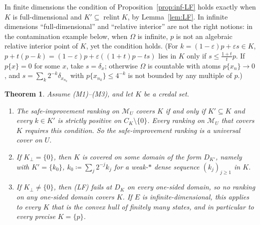 \documentclass[11pt]{article}
\newcommand{\M}{\mathcal{M}}
\DeclareMathOperator{\relint}{relint}
\theoremstyle{plain}
\newtheorem{theorem}{Theorem}[section]
\theoremstyle{definition}
\theoremstyle{remark}
\begin{document}
In finite dimensions the condition of Proposition~\ref{prop:inf-LF} holds exactly when $K$
is full-dimensional and $K'\subseteq\relint K$, by Lemma~\ref{lem:LF}. In infinite
dimensions ``full-dimensional'' and ``relative interior'' are not the right notions: in
the contamination example below, when $\Omega$ is infinite, $p$ is not an algebraic
relative interior point of $K$, yet the condition holds. (For $k=(1-\varepsilon)p+
\varepsilon s\in K$, $p+t(p-k)=(1-\varepsilon)p+\varepsilon((1+t)p-ts)$ lies in $K$ only if
$s\le\frac{1+t}tp$. If $p\{x\}=0$ for some $x$, take $s=\delta_x$; otherwise $\Omega$ is
countable with atoms $p\{x_n\}\to0$, and $s=\sum_k2^{-k}\delta_{x_{n_k}}$ with $p\{x_{n_k}\}
\le4^{-k}$ is not bounded by any multiple of $p$.)

\begin{theorem}\label{thm:inf-cover}
Assume (M1)--(M3), and let $K$ be a credal set.
\begin{enumerate}[label=(\alph*)]
  \item The safe-improvement ranking on $\M_U$ covers $K$ if and only if $K'\subseteq K$
  and every $k\in K'$ is strictly positive on $C_K\setminus\{0\}$. Every ranking on $\M_U$
  that covers $K$ requires this condition. So the safe-improvement ranking is a universal
  cover on $U$.
  \item If $K_\perp=\{0\}$, then $K$ is covered on some domain of the form $D_{K'}$, namely
  with $K'=\{k_0\}$, $k_0\coloneqq\sum_j2^{-j}k_j$ for a weak-$\ast$ dense sequence
  $(k_j)_{j\ge1}$ in $K$.
  \item If $K_\perp\ne\{0\}$, then (LF) fails at $D_K$ on every one-sided domain, so no
  ranking on any one-sided domain covers $K$. If $E$ is infinite-dimensional, this applies
  to every $K$ that is the convex hull of finitely many states, and in particular to every
  precise $K=\{p\}$.
\end{enumerate}
\end{theorem}
\end{document}
